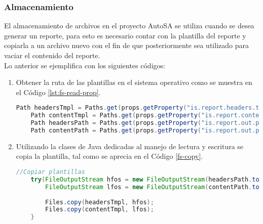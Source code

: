 \subsubsection{Almacenamiento}
El almacenamiento de archivos en el proyecto AutoSA se utiliza cuando se desea generar un reporte, para esto es necesario contar con la plantilla del reporte y copiarla a un archivo nuevo con el fin de que posteriormente sea utilizado para vaciar el contenido del reporte.\\
Lo anterior se ejemplifica con los siguientes códigos:
\begin{enumerate}
	\item Obtener la ruta de las plantillas en el sistema operativo como se muestra en el Código \ref{lst:fs-read-prop}.
	\begin{lstlisting}[language=Java, caption={Obtención de las rutas de las plantillas.}, captionpos=b, label={lst:fs-read-prop}]
	Path headersTmpl = Paths.get(props.getProperty("is.report.headers.tmpl"));
	Path contentTmpl = Paths.get(props.getProperty("is.report.content.tmpl"));
	Path headersPath = Paths.get(props.getProperty("is.report.out.path"), headersTmpl.getFileName().toString());
	Path contentPath = Paths.get(props.getProperty("is.report.out.path"), contentTmpl.getFileName().toString());
	\end{lstlisting}

	\item Utilizando la clases de Java dedicadas al manejo de lectura y escritura se copia la plantilla, tal como se aprecia en el Código \ref{fs-copy}.
	\begin{lstlisting}[language=Java, caption={Copia de archivos.}, captionpos=b, label={lst:fs-copy}]
	//Copiar plantillas
	try(FileOutputStream hfos = new FileOutputStream(headersPath.toFile(), false);
		FileOutputStream lfos = new FileOutputStream(contentPath.toFile(), false)){
		
		Files.copy(headersTmpl, hfos);
		Files.copy(contentTmpl, lfos);
	}
	\end{lstlisting}
\end{enumerate}
